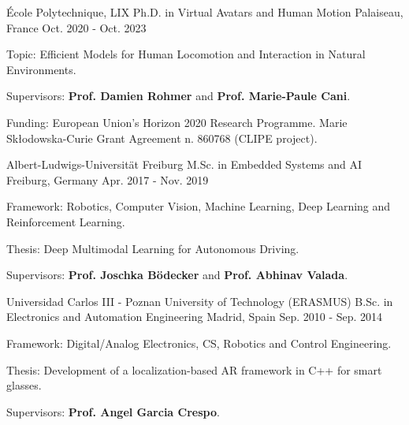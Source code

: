 

\begin{cventries}

  \cventry
    {École Polytechnique, LIX} %
    {Ph.D. in Virtual Avatars and Human Motion} %
    {Palaiseau, France} %
    {Oct. 2020 - Oct. 2023} %
    {
      \begin{cvitems} %
        \item {Topic: Efficient Models for Human Locomotion and Interaction in Natural Environments.}
        \item {Supervisors: \textbf{Prof. Damien Rohmer} and \textbf{Prof. Marie-Paule Cani}.}
        \item {Funding: European Union’s Horizon 2020 Research Programme. Marie Skłodowska-Curie Grant Agreement n. 860768 (CLIPE project).}
      \end{cvitems}
    }

  \vspace{0.5cm}
  \cventry
    {Albert-Ludwigs-Universität Freiburg} %
    {M.Sc. in Embedded Systems and AI} %
    {Freiburg, Germany} %
    {Apr. 2017 - Nov. 2019} %
    {
      \begin{cvitems} %
        \item {Framework: Robotics, Computer Vision, Machine Learning, Deep Learning and Reinforcement Learning.}
        \item {Thesis: Deep Multimodal Learning for Autonomous Driving.}
        \item {Supervisors: \textbf{Prof. Joschka Bödecker} and \textbf{Prof. Abhinav Valada}.}
      \end{cvitems}
    }

  \vspace{0.5cm}
  \cventry
    {Universidad Carlos III - Poznan University of Technology (ERASMUS)} %
    {B.Sc. in Electronics and Automation Engineering} %
    {Madrid, Spain} %
    {Sep. 2010 - Sep. 2014} %
    {
      \begin{cvitems} %
        \item {Framework: Digital/Analog Electronics, CS, Robotics and Control Engineering.}
        \item {Thesis: Development of a localization-based AR framework in C++ for smart glasses.}
        \item {Supervisors: \textbf{Prof. Angel Garcia Crespo}.}
      \end{cvitems}
    }

\end{cventries}

